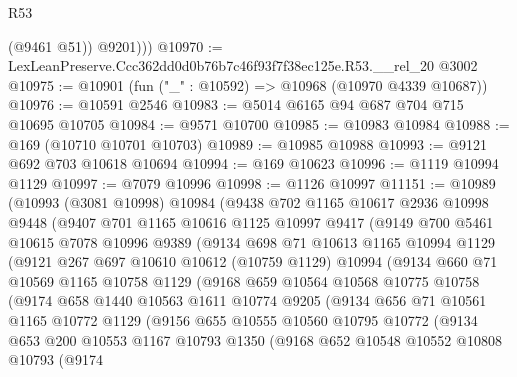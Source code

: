 \begin{lexlean}{R53}
\begin{coremodule}
            (@9461 @51))
          @9201)))
@10970 := LexLeanPreserve.Ccc362dd0d0b76b7c46f93f7f38ec125e.R53.__rel_20 @3002
@10975 := @10901 (fun ("_" : @10592) => @10968 (@10970 @4339 @10687))
@10976 := @10591 @2546
@10983 := @5014 @6165 @94 @687 @704 @715 @10695 @10705
@10984 := @9571 @10700
@10985 := @10983 @10984
@10988 := @169 (@10710 @10701 @10703)
@10989 := @10985 @10988
@10993 := @9121 @692 @703 @10618 @10694
@10994 := @169 @10623
@10996 := @1119 @10994 @1129
@10997 := @7079 @10996
@10998 := @1126 @10997
@11151 := @10989
    (@10993
      (@3081 @10998)
      @10984
      (@9438
        @702
        @1165
        @10617
        @2936
        @10998
        @9448
        (@9407
          @701
          @1165
          @10616
          @1125
          @10997
          @9417
          (@9149
            @700
            @5461
            @10615
            @7078
            @10996
            @9389
            (@9134
              @698
              @71
              @10613
              @1165
              @10994
              @1129
              (@9121
                @267
                @697
                @10610
                @10612
                (@10759 @1129)
                @10994
                (@9134
                  @660
                  @71
                  @10569
                  @1165
                  @10758
                  @1129
                  (@9168
                    @659
                    @10564
                    @10568
                    @10775
                    @10758
                    (@9174
                      @658
                      @1440
                      @10563
                      @1611
                      @10774
                      @9205
                      (@9134
                        @656
                        @71
                        @10561
                        @1165
                        @10772
                        @1129
                        (@9156
                          @655
                          @10555
                          @10560
                          @10795
                          @10772
                          (@9134
                            @653
                            @200
                            @10553
                            @1167
                            @10793
                            @1350
                            (@9168
                              @652
                              @10548
                              @10552
                              @10808
                              @10793
                              (@9174

\end{coremodule}
\end{lexlean}
